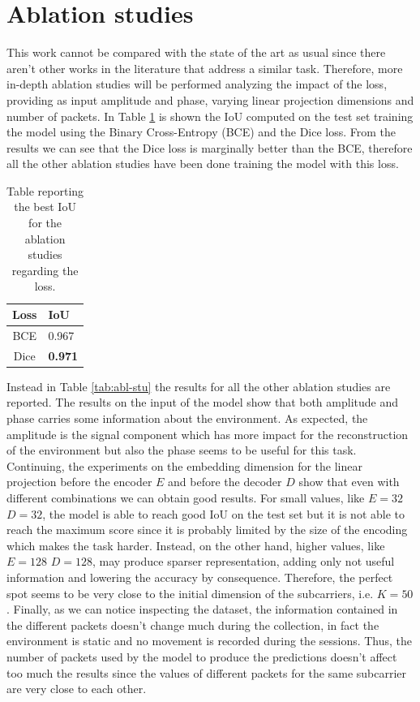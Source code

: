 \documentclass[binding=0.6cm,noexaminfo]{sapthesis}
\begin{document}
\section{Ablation studies}\label{sec:ablation}

This work cannot be compared with the state of the art as usual since there aren't other works in the literature that address a similar task. Therefore, more in-depth ablation studies will be performed analyzing the impact of the loss, providing as input amplitude and phase, varying linear projection dimensions and number of packets. In Table \ref{tab:loss-abl-stu} is shown the IoU computed on the test set training the model using the Binary Cross-Entropy (BCE) and the Dice loss. From the results we can see that the Dice loss is marginally better than the BCE, therefore all the other ablation studies have been done training the model with this loss.

\begin{table}[h!]
\centering
\begin{tabular}{|c|c|>{\centering\arraybackslash}p{}|}
\hline
\multicolumn{2}{|c|}{\textbf{Loss}} & \textbf{IoU} \\
\hline
\multicolumn{2}{|c|}{BCE} & 0.967 \\
\hline
\multicolumn{2}{|c|}{Dice} & \textbf{0.971} \\
\hline
\end{tabular}
\caption{Table reporting the best IoU for the ablation studies regarding the loss.}
\label{tab:loss-abl-stu}
\end{table}

Instead in Table \ref{tab:abl-stu} the results for all the other ablation studies are reported. The results on the input of the model show that both amplitude and phase carries some information about the environment. As expected, the amplitude is the signal component which has more impact for the reconstruction of the environment but also the phase seems to be useful for this task.
Continuing, the experiments on the embedding dimension for the linear projection before the encoder $E$ and before the decoder $D$ show that even with different combinations we can obtain good results. For small values, like $E=32$ $D=32$, the model is able to reach good IoU on the test set but it is not able to reach the maximum score since it is probably limited by the size of the encoding which makes the task harder. Instead, on the other hand, higher values, like $E=128$ $D=128$, may produce sparser representation, adding only not useful information and lowering the accuracy by consequence. Therefore, the perfect spot seems to be very close to the initial dimension of the subcarriers, i.e. $K = 50$.
Finally, as we can notice inspecting the dataset, the information contained in the different packets doesn't change much during the collection, in fact the environment is static and no movement is recorded during the sessions. Thus, the number of packets used by the model to produce the predictions doesn't affect too much the results since the values of different packets for the same subcarrier are very close to each other.
\end{document}
